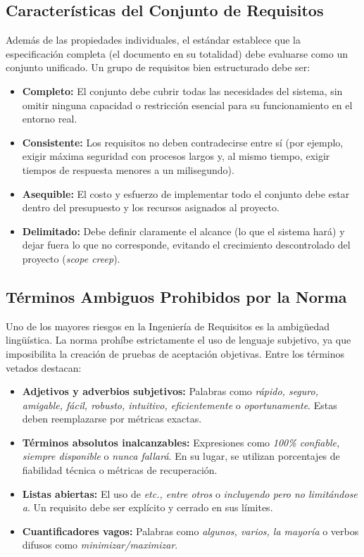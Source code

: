 \documentclass[12pt,a4paper]{article}
\begin{document}
\subsection{Características del Conjunto de Requisitos}
Además de las propiedades individuales, el estándar establece que la especificación completa (el documento en su totalidad) debe evaluarse como un conjunto unificado. Un grupo de requisitos bien estructurado debe ser:
\begin{itemize}
    \item \textbf{Completo:} El conjunto debe cubrir todas las necesidades del sistema, sin omitir ninguna capacidad o restricción esencial para su funcionamiento en el entorno real.
    \item \textbf{Consistente:} Los requisitos no deben contradecirse entre sí (por ejemplo, exigir máxima seguridad con procesos largos y, al mismo tiempo, exigir tiempos de respuesta menores a un milisegundo).
    \item \textbf{Asequible:} El costo y esfuerzo de implementar todo el conjunto debe estar dentro del presupuesto y los recursos asignados al proyecto.
    \item \textbf{Delimitado:} Debe definir claramente el alcance (lo que el sistema hará) y dejar fuera lo que no corresponde, evitando el crecimiento descontrolado del proyecto (\textit{scope creep}).
\end{itemize}

\subsection{Términos Ambiguos Prohibidos por la Norma}
Uno de los mayores riesgos en la Ingeniería de Requisitos es la ambigüedad lingüística. La norma prohíbe estrictamente el uso de lenguaje subjetivo, ya que imposibilita la creación de pruebas de aceptación objetivas. Entre los términos vetados destacan:
\begin{itemize}
    \item \textbf{Adjetivos y adverbios subjetivos:} Palabras como \textit{rápido, seguro, amigable, fácil, robusto, intuitivo, eficientemente} o \textit{oportunamente}. Estas deben reemplazarse por métricas exactas.
    \item \textbf{Términos absolutos inalcanzables:} Expresiones como \textit{100\% confiable, siempre disponible} o \textit{nunca fallará}. En su lugar, se utilizan porcentajes de fiabilidad técnica o métricas de recuperación.
    \item \textbf{Listas abiertas:} El uso de \textit{etc., entre otros} o \textit{incluyendo pero no limitándose a}. Un requisito debe ser explícito y cerrado en sus límites.
    \item \textbf{Cuantificadores vagos:} Palabras como \textit{algunos, varios, la mayoría} o verbos difusos como \textit{minimizar/maximizar}.
\end{itemize}
\end{document}
